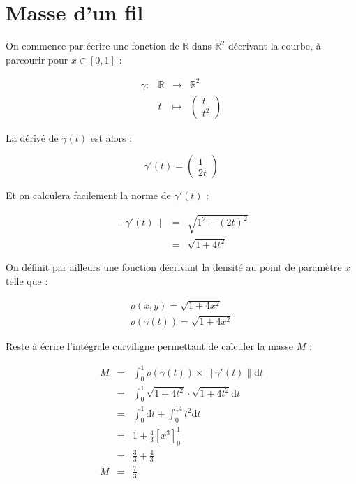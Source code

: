 \documentclass[a4paper, 11pt]{report} %
\newcommand{\dt}{\mathrm{d}t}
\newcommand{\R}{\mathbb{R}}
\renewcommand{\mapsto}{\longmapsto}
\begin{document}

\section{Masse d'un fil} %

On commence par écrire une fonction de $\R$ dans $\R^2$ décrivant la courbe, à parcourir pour $x \in [0, 1]$ :

\[
\begin{array}{llll}
    \gamma : & \R & \longrightarrow & \R^2\\
    & t & \mapsto & \begin{pmatrix}t\\t^2\end{pmatrix}
\end{array}
\]

La dérivé de $\gamma(t)$ est alors :

\[\gamma'(t) = \begin{pmatrix}1\\2t\end{pmatrix}\]

Et on calculera facilement la norme de $\gamma'(t)$ :

\begin{eqnarray*}
\lVert\gamma'(t)\rVert & = & \sqrt{1^2 + (2t)^2}\\
& = & \sqrt{1 + 4t^2}
\end{eqnarray*}

On définit par ailleurs une fonction décrivant la densité au point de paramètre $x$ telle que :

\[
\begin{array}{c}
\rho(x, y) = \sqrt{1+4x^2}\\
\rho(\gamma(t)) = \sqrt{1+4x^2}
\end{array}
\]

Reste à écrire l'intégrale curviligne permettant de calculer la masse $M$ :

\begin{eqnarray*}
M & = & \int_0^1\rho(\gamma(t))\times\lVert\gamma'(t)\rVert\dt\\
& = & \int_0^1\sqrt{1+4t^2}\cdot\sqrt{1+4t^2}\dt\\
& = & \int_0^1\dt + \int_0^14t^2\dt\\
& = & 1 + \frac{4}{3}\left[x^3\right]_0^1\\
& = & \frac{3}{3} + \frac{4}{3}\\
M & = & \frac{7}{3}
\end{eqnarray*}
\end{document}

